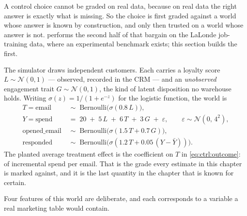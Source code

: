 A control choice cannot be graded on real data, because on real data the right answer is exactly
what is missing. So the choice is first graded against a world whose answer is known by
construction, and only then trusted on a world whose answer is not. 
performs the second half of that bargain on the LaLonde job-training data, where an experimental
benchmark exists; this section builds the first.

The simulator draws \nbFiveN{} independent customers. Each carries a loyalty score
$L \sim \mathcal N(0,1)$ --- observed, recorded in the CRM --- and an \emph{unobserved}
engagement trait $G \sim \mathcal N(0,1)$, the kind of latent disposition no warehouse holds.
Writing $\sigma(z) = 1/(1+e^{-z})$ for the logistic function, the world is
%
\begin{align}
  T = \text{email} &\;\sim\; \text{Bernoulli}\big(\sigma(0.8\,L)\big),
      \label{eq:ctrl:treat}\\
  Y = \text{spend} &\;=\; 20 \;+\; 5\,L \;+\; 6\,T \;+\; 3\,G \;+\; \varepsilon,
      \qquad \varepsilon \sim \mathcal N(0,\,4^{2}), \label{eq:ctrl:outcome}\\
  \text{opened\_email} &\;\sim\; \text{Bernoulli}\big(\sigma(1.5\,T + 0.7\,G)\big),
      \label{eq:ctrl:opened}\\
  \text{responded} &\;\sim\; \text{Bernoulli}\big(\sigma(1.2\,T + 0.05\,(Y - \bar Y))\big).
      \label{eq:ctrl:responded}
\end{align}
%
The planted average treatment effect is the coefficient on $T$ in \cref{eq:ctrl:outcome}:
\eur{\nbFiveTrueAte} of incremental spend per email. That is the grade every estimate in this
chapter is marked against, and it is the last quantity in the chapter that is known for certain.

Four features of this world are deliberate, and each corresponds to a variable a real marketing
table would contain.

